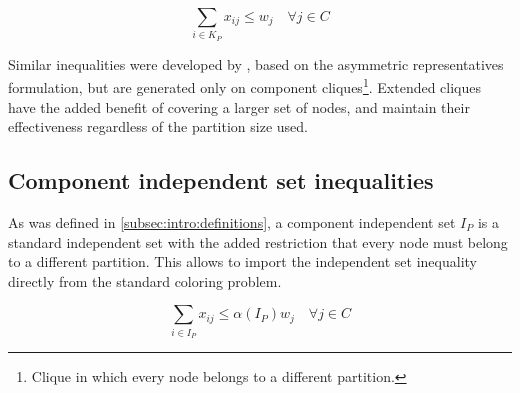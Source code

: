 \begin{equation}
\label{ineq:extendedclique}
\sum_{i \in K_P} x_{ij} \leq w_{j} \quad \forall j \in C
\end{equation}

Similar inequalities were developed by \cite{frota2010branch}, based on the asymmetric representatives formulation, but are generated only on component cliques\footnote{Clique in which every node belongs to a different partition.}. Extended cliques have the added benefit of covering a larger set of nodes, and maintain their effectiveness regardless of the partition size used.

\subsection{Component independent set inequalities}

As was defined in \ref{subsec:intro:definitions}, a component independent set $I_P$ is a standard independent set with the added restriction that every node must belong to a different partition. This allows to import the independent set inequality directly from the standard coloring problem.

\begin{equation}
\label{ineq:ciset}
\sum _{i \in I_P} x_{ij} \leq \alpha(I_P) w_{j} \quad \forall j \in C
\end{equation}



